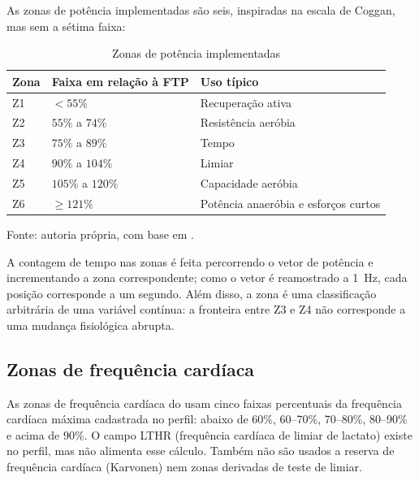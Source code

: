 As zonas de potência implementadas são seis, inspiradas na escala de Coggan,
mas sem a sétima faixa:

\begin{table}[htbp]
    \centering
    \caption{Zonas de potência implementadas}
    \label{tab:zonas-potencia}
    \small
    \begin{tabular}{@{}>{\raggedright\arraybackslash}p{1.4cm}
        >{\raggedright\arraybackslash}p{3.8cm}
        >{\raggedright\arraybackslash}p{7.4cm}@{}}
        \toprule
        \textbf{Zona} & \textbf{Faixa em relação à FTP} & \textbf{Uso típico} \\
        \midrule
        Z1 & $< 55\%$ & Recuperação ativa \\
        Z2 & $55\%$ a $74\%$ & Resistência aeróbia \\
        Z3 & $75\%$ a $89\%$ & Tempo \\
        Z4 & $90\%$ a $104\%$ & Limiar \\
        Z5 & $105\%$ a $120\%$ & Capacidade aeróbia \\
        Z6 & $\geq 121\%$ & Potência anaeróbia e esforços curtos \\
        \bottomrule
    \end{tabular}
    \vspace{0.2cm}
    \par\small Fonte: autoria própria, com base em
    .
\end{table}

A contagem de tempo nas zonas é feita percorrendo o vetor de potência e
incrementando a zona correspondente; como o vetor é reamostrado a
\SI{1}{\hertz}, cada posição corresponde a um segundo. Além disso, a zona é uma
classificação arbitrária de uma
variável contínua: a fronteira entre Z3 e Z4 não corresponde a uma mudança
fisiológica abrupta.

\subsection{Zonas de frequência cardíaca}
\label{sec:zonas-fc}

As zonas de frequência cardíaca do \argus{} usam cinco faixas percentuais da
frequência cardíaca máxima cadastrada no perfil: abaixo de 60\%, 60--70\%,
70--80\%, 80--90\% e acima de 90\%. O campo LTHR (frequência cardíaca de
limiar de lactato) existe no perfil, mas não alimenta esse cálculo. Também não
são usados a reserva de frequência cardíaca (Karvonen) nem zonas derivadas de
teste de limiar.

